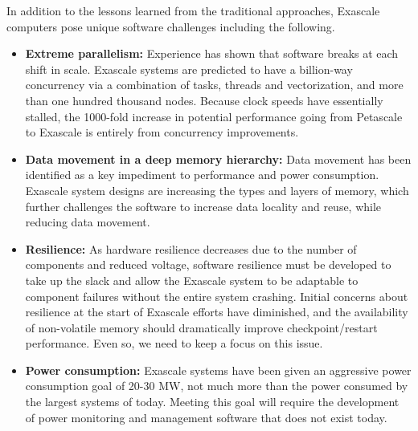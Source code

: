 In addition to the lessons learned from the traditional approaches, Exascale computers pose unique software challenges including the following.
\begin{itemize}
\item \textbf{Extreme parallelism:} Experience has shown that software breaks at each shift in scale. Exascale systems are predicted to have a billion-way concurrency via a combination of tasks, threads and vectorization, and more than one hundred thousand nodes. Because clock speeds have essentially stalled, the 1000-fold increase in potential performance going from Petascale to Exascale is entirely from concurrency improvements.
\item \textbf{Data movement in a deep memory hierarchy: }Data movement has been identified as a key impediment to performance and power consumption. Exascale system designs are increasing the types and layers of memory, which further challenges the software to increase data locality and reuse, while reducing data movement.
\item \textbf{Resilience:} As hardware resilience decreases due to the number of components and reduced voltage, software resilience must be developed to take up the slack and allow the Exascale system to be adaptable to component failures without the entire system crashing.  Initial concerns about resilience at the start of Exascale efforts have diminished, and the availability of non-volatile memory should dramatically improve checkpoint/restart performance.  Even so, we need to keep a focus on this issue.
\item \textbf{Power consumption:} Exascale systems have been given an aggressive power consumption goal of 20-30 MW, not much more than the power consumed by the largest systems of today. Meeting this goal will require the development of power monitoring and management software that does not exist today.
\end{itemize}
 
